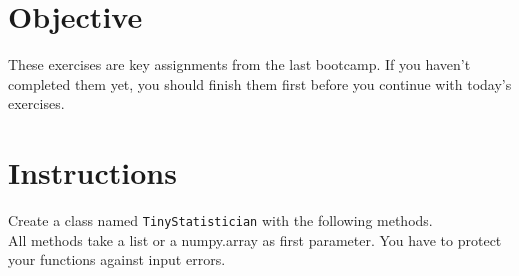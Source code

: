 \documentclass{42-en}
\begin{document}
\section*{Objective}
These exercises are key assignments from the last bootcamp. If you haven't completed them yet, you should finish them first before you continue with today's exercises.

\section*{Instructions}
Create a class named \texttt{TinyStatistician} with the following methods.\\
All methods take a list or a numpy.array as first parameter.
You have to protect your functions against input errors.
\end{document}
